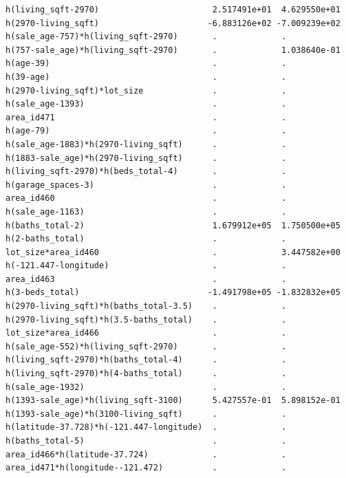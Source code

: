 \documentclass[
]{article}
\begin{document}
\begin{verbatim}
h(living_sqft-2970)                       2.517491e+01  4.629550e+01
h(2970-living_sqft)                      -6.883126e+02 -7.009239e+02
h(sale_age-757)*h(living_sqft-2970)       .             .           
h(757-sale_age)*h(living_sqft-2970)       .             1.038640e-01
h(age-39)                                 .             .           
h(39-age)                                 .             .           
h(2970-living_sqft)*lot_size              .             .           
h(sale_age-1393)                          .             .           
area_id471                                .             .           
h(age-79)                                 .             .           
h(sale_age-1883)*h(2970-living_sqft)      .             .           
h(1883-sale_age)*h(2970-living_sqft)      .             .           
h(living_sqft-2970)*h(beds_total-4)       .             .           
h(garage_spaces-3)                        .             .           
area_id460                                .             .           
h(sale_age-1163)                          .             .           
h(baths_total-2)                          1.679912e+05  1.750500e+05
h(2-baths_total)                          .             .           
lot_size*area_id460                       .             3.447582e+00
h(-121.447-longitude)                     .             .           
area_id463                                .             .           
h(3-beds_total)                          -1.491798e+05 -1.832832e+05
h(2970-living_sqft)*h(baths_total-3.5)    .             .           
h(2970-living_sqft)*h(3.5-baths_total)    .             .           
lot_size*area_id466                       .             .           
h(sale_age-552)*h(living_sqft-2970)       .             .           
h(living_sqft-2970)*h(baths_total-4)      .             .           
h(living_sqft-2970)*h(4-baths_total)      .             .           
h(sale_age-1932)                          .             .           
h(1393-sale_age)*h(living_sqft-3100)      5.427557e-01  5.898152e-01
h(1393-sale_age)*h(3100-living_sqft)      .             .           
h(latitude-37.728)*h(-121.447-longitude)  .             .           
h(baths_total-5)                          .             .           
area_id466*h(latitude-37.724)             .             .           
area_id471*h(longitude--121.472)          .             .           
                                                                    

\end{verbatim}
\end{document}
